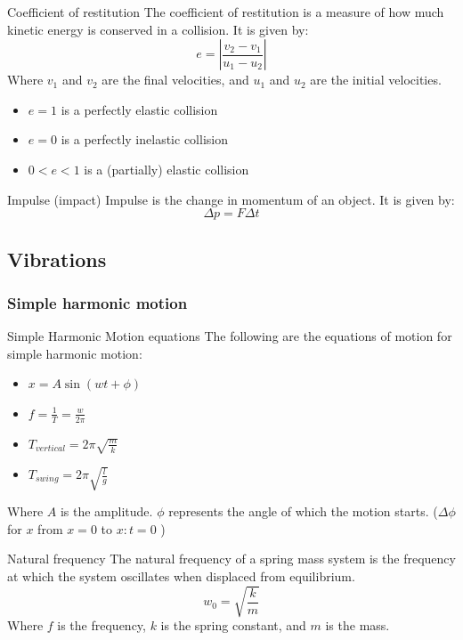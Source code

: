\begin{theorem}
    {Coefficient of restitution}
    The coefficient of restitution is a measure of how much kinetic energy is conserved in a collision. It is given by:
    \[e=|\frac{v_{2}-v_{1}}{u_{1}-u_{2}}|\]
    Where $v_{1}$ and $v_{2}$ are the final velocities, and $u_{1}$ and $u_{2}$ are the initial velocities.
    \begin{itemize}
        \item $e=1$ is a perfectly elastic collision
        \item $e=0$ is a perfectly inelastic collision
        \item $0<e<1$ is a (partially) elastic collision
    \end{itemize}
\end{theorem}

\begin{definition}
    {Impulse (impact)}
    Impulse is the change in momentum of an object. It is given by:
    \[\Delta p=F\Delta t\]
\end{definition}

\subsection{Vibrations}

\subsubsection{Simple harmonic motion}
\begin{theorem}
    {Simple Harmonic Motion equations}
    The following are the equations of motion for simple harmonic motion:
    \begin{itemize}
        \item $x=A\sin(wt+\phi)$
        \item $f=\frac{1}{T}=\frac{w}{2\pi}$
        \item $T_{vertical} = 2\pi\sqrt{\frac{m}{k}}$
        \item $T_{swing} = 2\pi\sqrt{\frac{l}{g}}$
    \end{itemize}
    Where $A$ is the amplitude. $\phi$ represents the angle of which the motion starts. ($\Delta\phi$ for $x$ from $x=0$ to $x:t=0$ )
\end{theorem}

\begin{definition}
    {Natural frequency}
    The natural frequency of a spring mass system is the frequency at which the system oscillates when displaced from equilibrium.
    \[w_0=\sqrt{\frac{k}{m}}\]
    Where $f$ is the frequency, $k$ is the spring constant, and $m$ is the mass.
\end{definition}

